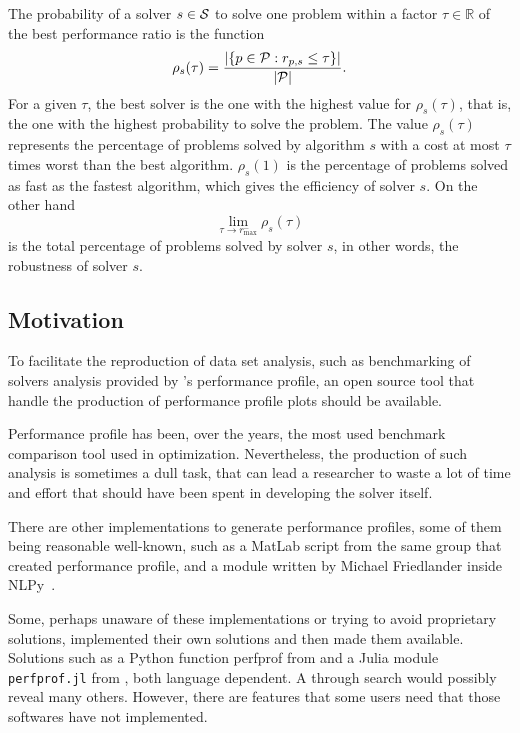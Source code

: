     The probability of a solver $s \in \mathcal{S}$  to solve one problem within a
    factor $\tau \in \mathds{R}$ of the best performance ratio is the function
    \begin{align*}
      \rho_s(\tau) = \frac{| \{p \in \mathcal{P}: r_{p,s} \leq \tau\} |}{| \mathcal{P} |}.
    \end{align*}
    For a given $\tau$, the best solver is the one with the highest value for
    $\rho_s(\tau)$, that is, the one with the highest probability to solve the
    problem.
    The value $\rho_s(\tau)$ represents the percentage of problems solved by
    algorithm $s$ with a cost at most $\tau$ times worst than the best
    algorithm. $\rho_s(1)$ is the percentage of problems solved as fast as the
    fastest algorithm, which gives the efficiency of solver $s$.
    On the other hand
    \[\displaystyle \lim_{\tau\rightarrow r^-_{\max}} \rho_s(\tau)\]
    is the total percentage of problems solved by solver $s$, in
    other words, the robustness of solver $s$.

\subsection*{Motivation}

    To facilitate the reproduction of data set analysis, such as 
    benchmarking of solvers analysis provided by \textcite{Dolan:2002du}'s
    performance profile,  an open source tool that handle
    the production of performance profile plots should be available.

    Performance profile has been, over the years, the most used benchmark
    comparison tool used in optimization. Nevertheless, the production of such
    analysis is sometimes a dull task, that can lead a researcher to waste a lot
    of time and effort that should have been spent in developing the solver
    itself.

    There are other
    implementations to generate  performance profiles,
    some of them being reasonable well-known, such as a MatLab
    script\cite{url:cops} from
    the same group that created  performance profile,
    and a module written by
    Michael Friedlander inside
    NLPy~\cite{url:NLPy}.

    Some, perhaps unaware of these implementations or trying to avoid
    proprietary solutions, implemented their own solutions and then made
    them
    available. Solutions such as a Python function perfprof from \textcite
    {url:perfprof}
    and a  Julia module {\tt perfprof.jl} from \textcite{url:perfprofjl}, 
    both language dependent. A through search would possibly reveal many
    others.  However, there are features that some users need that those softwares have
    not implemented.

